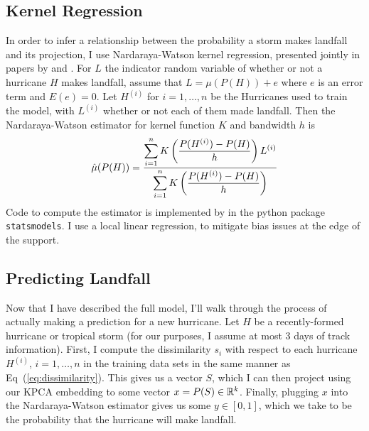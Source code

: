 \subsection{Kernel Regression}
In order to infer a relationship between the probability a storm makes landfall and its projection, I use Nardaraya-Watson kernel regression, presented jointly in papers by \cite{nadaraya1964estimating} and \cite{watson1964smooth}.
For $L$ the indicator random variable of whether or not a hurricane $H$ makes landfall, assume that $L=\mu(P(H))+e$ where $e$ is an error term and $E(e)=0$.
Let $H^{(i)}$ for $i=1,\ldots,n$ be the Hurricanes used to train the model, with $L^{(i)}$ whether or not each of them made landfall.
Then the Nardaraya-Watson estimator for kernel function $K$ and bandwidth $h$ is
\begin{equation}
	\hat\mu(P(H))=\frac{\displaystyle\sum_{i=1}^{n}K\left(\frac{P(H^{(i)})-P(H)}{h}\right)L^{(i)}}{\displaystyle\sum_{i=1}^{n}K\left(\frac{P(H^{(i)})-P(H)}{h}\right)}
	\label{eq:kernel_regression}
\end{equation}
Code to compute the estimator is implemented by \cite{seabold2010statsmodels} in the python package \texttt{statsmodels}.
I use a local linear regression, to mitigate bias issues at the edge of the support.

\subsection{Predicting Landfall}
Now that I have described the full model, I'll walk through the process of actually making a prediction for a new hurricane.
Let $H$ be a recently-formed hurricane or tropical storm (for our purposes, I assume at most $3$ days of track information).
First, I compute the dissimilarity $s_{i}$ with respect to each hurricane $H^{(i)}$, $i=1,\ldots,n$ in the training data sets in the same manner as Eq~(\ref{eq:dissimilarity}).
This gives us a vector $S$, which I can then project using our KPCA embedding to some vector $x=P(S)\in\mathbb{R}^{k}$. Finally, plugging $x$ into the Nardaraya-Watson estimator gives us some $y\in[0,1]$, which we take to be the probability that the hurricane will make landfall.